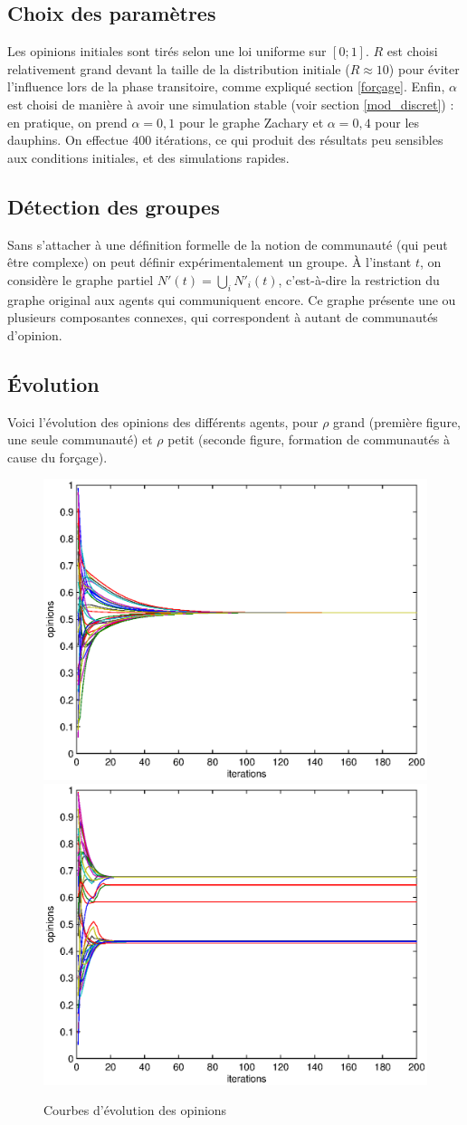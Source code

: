 \documentclass[12pt]{article}
\begin{document}
\subsection{Choix des paramètres}
Les opinions initiales sont tirés selon une loi uniforme sur $[0; 1]$.
$R$ est choisi relativement grand devant la taille de la distribution
initiale ($R\approx10$) pour éviter l'influence lors de la phase
transitoire, comme expliqué section \ref{forçage}. Enfin, $\alpha$ est
choisi de manière à avoir une simulation stable (voir section
\ref{mod_discret}) : en pratique, on prend $\alpha = 0,1$ pour le
graphe Zachary et $\alpha = 0,4$ pour les dauphins. On effectue $400$
itérations, ce qui produit des résultats peu sensibles aux conditions
initiales, et des simulations rapides.

\subsection{Détection des groupes}
Sans s'attacher à une définition formelle de la notion de communauté
(qui peut être complexe) on peut définir expérimentalement un
groupe. À l'instant $t$, on considère le graphe partiel $N'(t) =
\bigcup_i N'_i(t)$, c'est-à-dire la restriction du graphe original aux
agents qui communiquent encore. Ce graphe présente une ou plusieurs
composantes connexes, qui correspondent à autant de communautés
d'opinion.

\subsection{Évolution}

Voici l'évolution des opinions des différents agents, pour $\rho$
grand (première figure, une seule communauté) et $\rho$ petit (seconde
figure, formation de communautés à cause du forçage).

\begin{figure}[htb]
	\begin{center}
		\includegraphics[width=.4\textwidth]{evolution_ok}
		\includegraphics[width=.4\textwidth]{evolution_clusters}
	\end{center}
	\caption{Courbes d'évolution des opinions}
	\label{fig:evol}
\end{figure}
\end{document}
